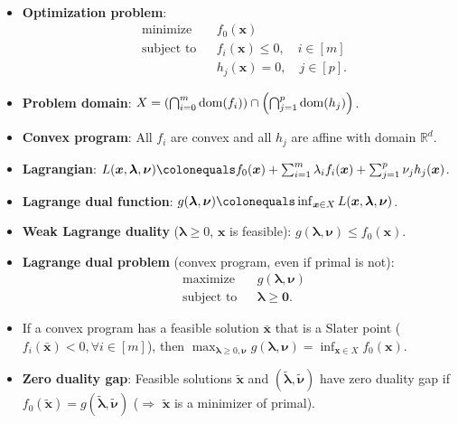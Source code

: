 \documentclass[8pt,a4paper]{extarticle}
\newcommand{\lft}{\mathopen{}\mathclose\bgroup\left}
\newcommand{\rgt}{\aftergroup\egroup\right}
\newcommand{\R}{\mathbb{R}}
\renewcommand{\vec}[1]{\bm{#1}}
\newcommand{\dom}[1]{\mathrm{dom}(#1)}
\newenvironment{topic}[1]
{\textbf{\sffamily \colorbox{black}{\rlap{\textbf{\textcolor{white}{#1}}}\hspace{\linewidth}\hspace{-2\fboxsep}}} \\ \vspace{0.2cm}}
{}
\begin{document}
\begin{multicols*}{2}
    \begin{topic}{Non-linear programming}
        \begin{itemize}
            \item \textbf{Optimization problem}:
                  \begin{align*}
                       & \text{minimize}   &  & f_0(\vec{x})                         \\
                       & \text{subject to} &  & f_i(\vec{x}) \leq 0, \quad i \in [m] \\
                       &                   &  & h_j(\vec{x}) = 0, \quad j \in [p].
                  \end{align*}
            \item \textbf{Problem domain}: $X = \lft( \bigcap_{i=0}^m \dom{f_i} \rgt) \cap \lft( \bigcap_{j=1}^p \dom{h_j} \rgt)$.
            \item \textbf{Convex program}: All $f_i$ are convex and all $h_j$ are affine with domain $\R^d$.
            \item \textbf{Lagrangian}: $L(\vec{x}, \vec{\lambda}, \vec{\nu}) \colonequals f_0(\vec{x}) + \sum_{i=1}^{m} \lambda_i f_i(\vec{x}) + \sum_{j=1}^{p} \nu_j h_j(\vec{x})$.
            \item \textbf{Lagrange dual function}: $g(\vec{\lambda}, \vec{\nu}) \colonequals \inf_{\vec{x} \in X} L(\vec{x}, \vec{\lambda}, \vec{\nu})$.
            \item \textbf{Weak Lagrange duality} ($\vec{\lambda} \geq 0$, $\vec{x}$ is feasible): $g(\vec{\lambda}, \vec{\nu}) \leq f_0(\vec{x})$.
            \item \textbf{Lagrange dual problem} (convex program, even if primal is not):
                  \begin{align*}
                       & \text{maximize}   &  & g(\vec{\lambda}, \vec{\nu}) \\
                       & \text{subject to} &  & \vec{\lambda} \geq \vec{0}.
                  \end{align*}
            \item If a convex program has a feasible solution $\bar{\vec{x}}$ that is a Slater point
                  ($f_i(\bar{\vec{x}}) < 0, \forall i \in[m]$), then $\max_{\vec{\lambda} \geq 0, \vec{\nu}}
                      g(\vec{\lambda}, \vec{\nu}) = \inf_{\vec{x} \in X} f_0(\vec{x})$.
            \item \textbf{Zero duality gap}: Feasible solutions $\tilde{\vec{x}}$ and $(\tilde{\vec{\lambda}}, \tilde{\vec{\nu}})$ have zero duality gap if $f_0(\tilde{\vec{x}}) = g(\tilde{\vec{\lambda}}, \tilde{\vec{\nu}})$ ($\Rightarrow$ $\tilde{\vec{x}}$ is a minimizer of primal).

\end{itemize}
\end{topic}
\end{multicols*}
\end{document}
